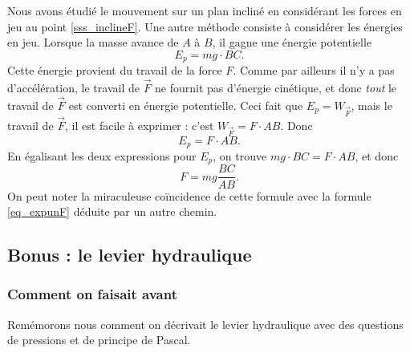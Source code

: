 \documentclass[a4paper,12pt]{book}
\theoremstyle{mes_exemples}	\newtheorem{exemple}[numtho]{Exemple}
\theoremstyle{mes_tho}
\newcommand{\fF}{\overrightarrow{F}}
\begin{document}
Nous avons étudié le mouvement sur un plan incliné en considérant les forces en jeu au point \ref{sss_inclineF}. Une autre méthode consiste à considérer les énergies en jeu. Lorsque la masse avance de $A$ à $B$, il gagne une énergie potentielle 
\[ 
 E_p=mg\cdot BC. 
\]
Cette énergie provient du travail de la force $F$. Comme par ailleurs il n'y a pas d'accélération, le travail de $\fF$ ne fournit pas d'énergie cinétique, et donc \emph{tout} le travail de $\fF$ est converti en énergie potentielle. Ceci fait que $E_p=W_{\fF}$, mais le travail de $\fF$, il est facile à exprimer : c'est $W_{\fF}=F\cdot AB$. Donc
\[ 
  E_p=F\cdot AB.
\]
En égalisant les deux expressions pour $E_p$, on trouve $mg\cdot BC=F\cdot AB$, et donc
\begin{equation}  \label{eq_expdeuxF}
  F=mg\frac{ BC}{ AB }.
\end{equation}
On peut noter la miraculeuse coïncidence de cette formule avec la formule \eqref{eq_expunF} déduite par un autre chemin. 

\subsection{Bonus : le levier hydraulique}

\subsubsection{Comment on faisait avant}

Remémorons nous comment on décrivait le levier hydraulique avec des questions de pressions et de principe de Pascal.
\end{document}
